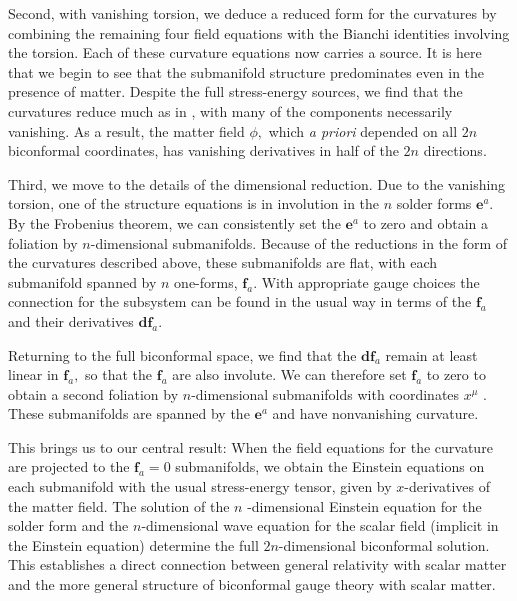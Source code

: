 \documentclass[a4paper,a4paper]{article}
\begin{document}
\smallskip

Second, with vanishing torsion, we deduce a reduced form for the curvatures
by combining the remaining four field equations with the Bianchi identities
involving the torsion. Each of these curvature equations now carries a
source. It is here that we begin to see that the submanifold structure
predominates even in the presence of matter. Despite the full stress-energy
sources, we find that the curvatures reduce much as in \cite{WW}, with many of
the components necessarily vanishing. As a result, the matter field $\phi ,$
which \textit{a priori }depended on all $2n$ biconformal coordinates, has
vanishing derivatives in half of the $2n$ directions.

\smallskip

Third, we move to the details of the dimensional reduction. Due to the
vanishing torsion, one of the structure equations is in involution in the $n$
solder forms $\mathbf{e}^{a}$. By the Frobenius theorem, we can consistently
set the $\mathbf{e}^{a}$ to zero and obtain a foliation by $n$-dimensional
submanifolds. Because of the reductions in the form of the curvatures
described above, these submanifolds are flat, with each submanifold spanned
by $n$ one-forms, $\mathbf{f}_{a}$. With appropriate gauge choices the
connection for the subsystem can be found in the usual way in terms of the $%
\mathbf{f}_{a}$ and their derivatives $\mathbf{df}_{a}$.

Returning to the full biconformal space, we find that the $\mathbf{df}_{a}$
remain at least linear in $\mathbf{f}_{a},$ so that the $\mathbf{f}_{a}$ are
also involute. We can therefore set $\mathbf{f}_{a}$ to zero to obtain a
second foliation by $n$-dimensional submanifolds with coordinates $x^{\mu }$%
. These submanifolds are spanned by the $\mathbf{e}^{a}$ and have
nonvanishing curvature.

This brings us to our central result: When the field equations for the
curvature are projected to the $\mathbf{f}_{a}=0$ submanifolds, we obtain
the Einstein equations on each submanifold with the usual stress-energy
tensor, given by $x$-derivatives of the matter field. The solution of the $n$%
-dimensional Einstein equation for the solder form and the $n$-dimensional
wave equation for the scalar field (implicit in the Einstein equation)
determine the full $2n$-dimensional biconformal solution. This establishes a
direct connection between general relativity with scalar matter and the more
general structure of biconformal gauge theory with scalar matter.
\end{document}
